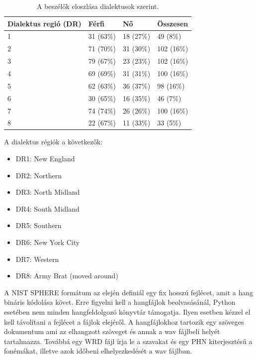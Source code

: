 \begin{table}[!ht]
	\begin{tabular}{*4l} \toprule
		\bfseries Dialektus regió (DR) & \bfseries Férfi & \bfseries Nő & \bfseries Összesen \\ \midrule
		1                             & 31 (63\%)      & 18 (27\%)   & 49 (8\%)          \\
		\rowcolor{gray!10} 
		2                             & 71 (70\%)      & 31 (30\%)   & 102 (16\%)        \\
		3                             & 79 (67\%)      & 23 (23\%)   & 102 (16\%)        \\
		\rowcolor{gray!10} 
		4                             & 69 (69\%)      & 31 (31\%)   & 100 (16\%)        \\
		5                             & 62 (63\%)      & 36 (37\%)   & 98 (16\%)         \\
		\rowcolor{gray!10} 
		6                             & 30 (65\%)      & 16 (35\%)   & 46 (7\%)          \\
		7                             & 74 (74\%)      & 26 (26\%)   & 100 (16\%)        \\
		\rowcolor{gray!10} 
		8                             & 22 (67\%)      & 11 (33\%)   & 33 (5\%)          \\
		\bottomrule
		\hline
	\end{tabular}
	\centering
	\caption{A beszélők eloszlása dialektusok szerint.}
	\label{fig:timit-dialects}
\end{table}

A dialektus régiók a következők:

\begin{multicols}{2}
	\begin{itemize}
		\item DR1:  New England
		\item DR2:  Northern
		\item DR3:  North Midland
		\item DR4:  South Midland
		\item DR5:  Southern
		\item DR6:  New York City
		\item DR7:  Western
		\item DR8:  Army Brat (moved around)
	\end{itemize}
\end{multicols}

A NIST SPHERE formátum az elején definiál egy fix hosszú fejlécet, amit a hang bináris kódolása követ. Erre figyelni kell a hangfájlok beolvasásánál, Python esetében nem minden hangfeldolgozó könyvtár támogatja. Ilyen esetben kézzel el kell távolítani a fejlécet a fájlok elejéről. A hangfájlokhoz tartozik egy szöveges dokumentum ami az elhangzott szöveget és annak a wav fájlbeli helyét tartalmazza. Továbbá egy WRD fájl írja le a szavakat és egy PHN kiterjesztésű a fonémákat, illetve azok időbeni elhelyezkedését a wav fájlban.

